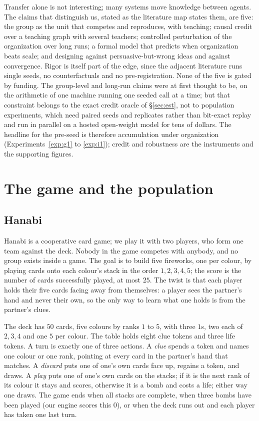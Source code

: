 \documentclass[11pt]{article}
\numberwithin{theorem}{section}
\theoremstyle{definition}
\theoremstyle{problemstyle}
\begin{document}
\begin{remark}
Transfer alone is not interesting; many systems move knowledge between agents. The claims that distinguish us, stated
as the literature map states them, are five: the group as the unit that competes and reproduces, with teaching; causal
credit over a teaching graph with several teachers; controlled perturbation of the organization over long runs; a
formal model that predicts when organization beats scale; and designing against persuasive-but-wrong ideas and against
convergence. Rigor is itself part of the edge, since the adjacent literature runs single seeds, no counterfactuals and
no pre-registration. None of the five is gated by funding. The group-level and long-run claims were at first thought to
be, on the arithmetic of one machine running one seeded call at a time; but that constraint belongs to the exact
credit oracle of \S\ref{sec:est}, not to population experiments, which need paired seeds and replicates rather than
bit-exact replay and run in parallel on a hosted open-weight model for tens of dollars. The headline for the
pre-seed is therefore accumulation under organization (Experiments~\ref{exp:g1} to \ref{exp:i1}); credit and
robustness are the instruments and the supporting figures.
\end{remark}

\section{The game and the population}\label{sec:game}

\subsection{Hanabi}

Hanabi is a cooperative card game; we play it with two players, who form one team against the deck. Nobody in the game
competes with anybody, and no group exists inside a game. The goal is to build five fireworks, one per colour, by
playing cards onto each colour's stack in the order $1,2,3,4,5$; the score is the number of cards successfully played,
at most $25$. The twist is that each player holds their five cards facing away from themselves: a player sees the
partner's hand and never their own, so the only way to learn what one holds is from the partner's clues.

The deck has $50$ cards, five colours by ranks $1$ to $5$, with three $1$s, two each of $2,3,4$ and one $5$ per
colour. The table holds eight clue tokens and three life tokens. A turn is exactly one of three actions. A
\emph{clue} spends a token and names one colour or one rank, pointing at every card in the partner's hand that
matches. A \emph{discard} puts one of one's own cards face up, regains a token, and draws. A \emph{play} puts one of
one's own cards on the stacks; if it is the next rank of its colour it stays and scores, otherwise it is a bomb and
costs a life; either way one draws. The game ends when all stacks are complete, when three bombs have been played (our
engine scores this $0$), or when the deck runs out and each player has taken one last turn.
\end{document}
